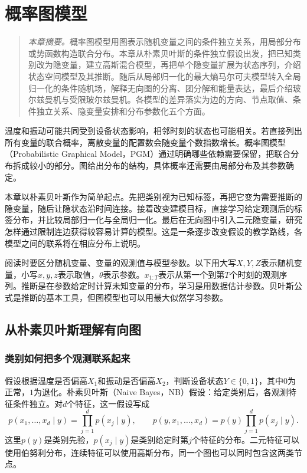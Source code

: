 \chapter{概率图模型}
\label{chap:graphical-models}
\begin{quote}\small
\textit{本章摘要。}概率图模型用图表示随机变量之间的条件独立关系，用局部分布或势函数构造联合分布。本章从朴素贝叶斯的条件独立假设出发，把已知类别改为隐变量，建立高斯混合模型，再把单个隐变量扩展为状态序列，介绍状态空间模型及其推断。随后从局部归一化的最大熵马尔可夫模型转入全局归一化的条件随机场，解释无向图的分离、团分解和能量表达，最后介绍玻尔兹曼机与受限玻尔兹曼机。各模型的差异落实为边的方向、节点取值、条件独立关系、隐变量安排和分布参数化五个方面。
\end{quote}

温度和振动可能共同受到设备状态影响，相邻时刻的状态也可能相关。若直接列出所有变量的联合概率，离散变量的配置数会随变量个数指数增长。概率图模型（Probabilistic Graphical Model，PGM）通过明确哪些依赖需要保留，把联合分布拆成较小的部分\cite{bishop2006pattern,murphy2022pml}。图给出分布的结构，具体概率还需要由局部分布及其参数确定。

本章以朴素贝叶斯作为简单起点。先把类别视为已知标签，再把它变为需要推断的隐变量，随后让隐状态沿时间连接。接着改变建模目标，直接学习给定观测后的标签分布，并比较局部归一化与全局归一化。最后在无向图中引入二元隐变量，研究怎样通过限制连边获得较容易计算的模型。这是一条逐步改变假设的教学路线，各模型之间的联系将在相应分布上说明。

阅读时要区分随机变量、变量的观测值与模型参数。以下用大写$X,Y,Z$表示随机变量，小写$x,y,z$表示取值，$\theta$表示参数。$x_{1:T}$表示从第一个到第$T$个时刻的观测序列。推断是在参数给定时计算未知变量的分布，学习是用数据估计参数。贝叶斯公式是推断的基本工具，但图模型也可以用最大似然学习参数。

\section{从朴素贝叶斯理解有向图}
\subsection{类别如何把多个观测联系起来}
假设根据温度是否偏高$X_1$和振动是否偏高$X_2$，判断设备状态$Y\in\{0,1\}$，其中$0$为正常，$1$为退化。朴素贝叶斯（Naive Bayes，NB）假设：给定类别后，各观测特征条件独立。对$d$个特征，这一假设写成
\begin{equation}
 p(x_1,\ldots,x_d\mid y)=\prod_{j=1}^d p(x_j\mid y),
 \qquad p(y,x_1,\ldots,x_d)=p(y)\prod_{j=1}^d p(x_j\mid y).
 \label{eq:bayes-naive-joint}
\end{equation}
这里$p(y)$是类别先验，$p(x_j\mid y)$是类别给定时第$j$个特征的分布。二元特征可以使用伯努利分布，连续特征可以使用高斯分布，同一个图也可以同时包含这两类节点。

